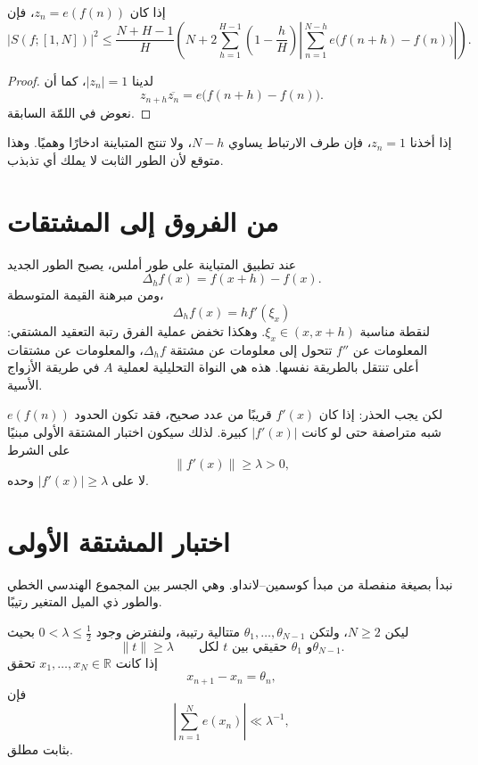 \begin{corollary}
\label{cor:van-der-corput-phase}
إذا كان \(z_n=e(f(n))\)، فإن
\[
|S(f;[1,N])|^2
\le
\frac{N+H-1}{H}
\left(
N+2\sum_{h=1}^{H-1}
\left(1-\frac{h}{H}\right)
\left|\sum_{n=1}^{N-h}e\bigl(f(n+h)-f(n)\bigr)\right|
\right).
\]
\end{corollary}

\begin{proof}
لدينا \(|z_n|=1\)، كما أن
\[
z_{n+h}\overline{z_n}
=e\bigl(f(n+h)-f(n)\bigr).
\]
نعوض في اللمّة السابقة.
\end{proof}

\begin{remark}
إذا أخذنا \(z_n=1\)، فإن طرف الارتباط يساوي \(N-h\)، ولا تنتج المتباينة ادخارًا وهميًا. وهذا متوقع لأن الطور الثابت لا يملك أي تذبذب.
\end{remark}

\section{من الفروق إلى المشتقات}

عند تطبيق المتباينة على طور أملس، يصبح الطور الجديد
\[
\Delta_hf(x)=f(x+h)-f(x).
\]
ومن مبرهنة القيمة المتوسطة،
\[
\Delta_hf(x)=h f'(\xi_x)
\]
لنقطة مناسبة \(\xi_x\in(x,x+h)\). وهكذا تخفض عملية الفرق رتبة التعقيد المشتقي: المعلومات عن \(f''\) تتحول إلى معلومات عن مشتقة \(\Delta_hf\)، والمعلومات عن مشتقات أعلى تنتقل بالطريقة نفسها. هذه هي النواة التحليلية لعملية \(A\) في طريقة الأزواج الأسية.

لكن يجب الحذر: إذا كان \(f'(x)\) قريبًا من عدد صحيح، فقد تكون الحدود \(e(f(n))\) شبه متراصفة حتى لو كانت \(|f'(x)|\) كبيرة. لذلك سيكون اختبار المشتقة الأولى مبنيًا على الشرط
\[
\|f'(x)\|\ge\lambda>0,
\]
لا على \(|f'(x)|\ge\lambda\) وحده.

\section{اختبار المشتقة الأولى}

نبدأ بصيغة منفصلة من مبدأ كوسمين--لانداو. وهي الجسر بين المجموع الهندسي الخطي والطور ذي الميل المتغير رتيبًا.

\begin{lemma}
\label{lem:kusmin-landau-discrete}
ليكن \(N\ge2\)، ولتكن \(\theta_1,\dots,\theta_{N-1}\) متتالية رتيبة، ولنفترض وجود \(0<\lambda\le\tfrac12\) بحيث
\[
\|t\|\ge\lambda
\qquad
\text{لكل \(t\) حقيقي بين \(\theta_1\) و\(\theta_{N-1}\)}.
\]
إذا كانت \(x_1,\dots,x_N\in\mathbb R\) تحقق
\[
x_{n+1}-x_n=\theta_n,
\]
فإن
\[
\left|\sum_{n=1}^{N}e(x_n)\right|\ll \lambda^{-1},
\]
بثابت مطلق.
\end{lemma}

